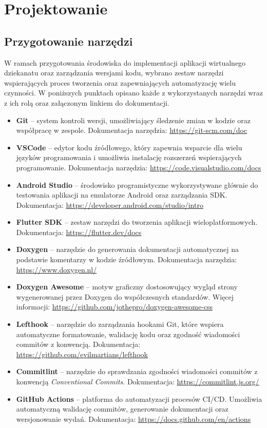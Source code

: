 \newpage
\section{Projektowanie}
\subsection{Przygotowanie narzędzi}

W ramach przygotowania środowiska do implementacji aplikacji wirtualnego dziekanatu oraz zarządzania wersjami kodu, wybrano zestaw narzędzi wspierających proces tworzenia oraz zapewniających automatyzację wielu czynności. W poniższych punktach opisano każde z wykorzystanych narzędzi wraz z ich rolą oraz załączonym linkiem do dokumentacji.

\begin{itemize}
  \item \textbf{Git} – system kontroli wersji, umożliwiający śledzenie zmian w kodzie oraz współpracę w zespole. Dokumentacja narzędzia: \url{https://git-scm.com/doc}
  \item \textbf{VSCode} – edytor kodu źródłowego, który zapewnia wsparcie dla wielu języków programowania i umożliwia instalację rozszerzeń wspierających programowanie. Dokumentacja narzędzia: \url{https://code.visualstudio.com/docs}
  \item \textbf{Android Studio} – środowisko programistyczne wykorzystywane głównie do testowania aplikacji na emulatorze Android oraz zarządzania SDK. Dokumentacja: \url{https://developer.android.com/studio/intro}
  \item \textbf{Flutter SDK} – zestaw narzędzi do tworzenia aplikacji wieloplatformowych. Dokumentacja: \url{https://flutter.dev/docs}
  \item \textbf{Doxygen} – narzędzie do generowania dokumentacji automatycznej na podstawie komentarzy w kodzie źródłowym. Dokumentacja narzędzia: \url{https://www.doxygen.nl/}
  \item \textbf{Doxygen Awesome} – motyw graficzny dostosowujący wygląd strony wygenerowanej przez Doxygen do współczesnych standardów. Więcej informacji: \url{https://github.com/jothepro/doxygen-awesome-css}
  \item \textbf{Lefthook} – narzędzie do zarządzania hookami Git, które wspiera automatyczne formatowanie, walidację kodu oraz zgodność wiadomości commitów z konwencją. Dokumentacja: \url{https://github.com/evilmartians/lefthook}
  \item \textbf{Commitlint} – narzędzie do sprawdzania zgodności wiadomości commitów z konwencją \textit{Conventional Commits}. Dokumentacja: \url{https://commitlint.js.org/}
  \item \textbf{GitHub Actions} – platforma do automatyzacji procesów CI/CD. Umożliwia automatyczną walidację commitów, generowanie dokumentacji oraz wersjonowanie wydań. Dokumentacja: \url{https://docs.github.com/en/actions}
\end{itemize}

